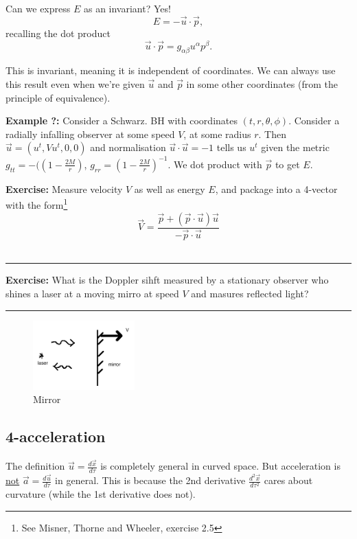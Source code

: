 \documentclass[a4paper]{article} %
\newcommand{\exercise}[2]
{
\begin{framed}
\textbf{Exercise:} #1 \\\hrule
#2
\end{framed}
}
\newcommand{\example}[2]
{
\begin{framed}
\textbf{Example #1:} #2
\end{framed}
}
\begin{document}
Can we express $E$ as an invariant? Yes!
\begin{equation}
E=-\vec{u}\cdot\vec{p},
\end{equation}
recalling the dot product
\begin{equation}
\vec{u}\cdot\vec{p}=g_{\alpha\beta}u^{\alpha}p^{\beta}.
\end{equation}


This is invariant, meaning it is independent of coordinates. We can always use this result even when we're given $\vec{u}$ and $\vec{p}$ in some other coordinates (from the principle of equivalence).

\example{?}{Consider a Schwarz. BH with coordinates $(t,r,\theta,\phi)$. Consider a radially infalling observer at some speed $V$, at some radius $r$. Then $\vec{u}=(u^t,Vu^t,0,0)$ and normalisation $\vec{u}\cdot\vec{u}=-1$ tells us $u^t$ given the metric $g_{tt}=-(\left(1-\frac{2M}{r}\right)$, $g_{rr}=\left(1-\frac{2M}{r}\right)^{-1}$. We dot product with $\vec{p}$ to get $E$.}

\exercise{Measure velocity $V$ as well as energy $E$, and package into a 4-vector with the form\footnote{See Misner, Thorne and Wheeler, exercise 2.5}
\begin{equation}
\vec{V}=\frac{\vec{p}+(\vec{p}\cdot\vec{u})\vec{u}}{-\vec{p}\cdot\vec{u}}
\end{equation}
}{}

\exercise{What is the Doppler sihft measured by a stationary observer who shines a laser at a moving mirro at speed $V$ and masures reflected light?
}{}
\begin{figure}[h]
\centering
\includegraphics[width=0.35\textwidth]{images/mirror.png}
\caption{Mirror}
\end{figure}

\subsection{4-acceleration}
The definition $\vec{u}=\frac{d\vec{x}}{d\tau}$ is completely general in curved space. But acceleration is \underline{not} $\vec{a}=\frac{d\vec{u}}{d\tau}$ in general. This is because the 2nd derivative $\frac{d^2\vec{x}}{d\tau^2}$ cares about curvature (while the 1st derivative does not).
\end{document}
